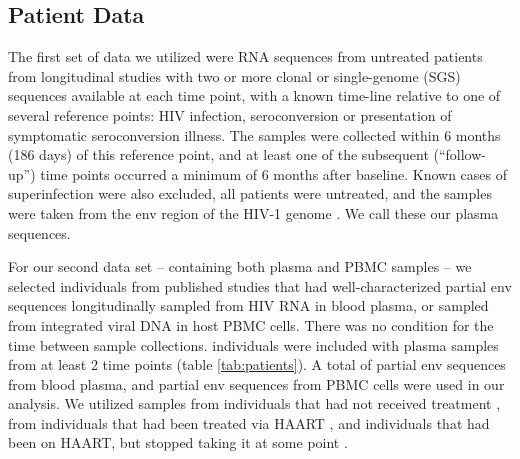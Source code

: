\subsection{Patient Data} \label{subsec:patdata}
The first set of data we utilized were RNA sequences from untreated patients from longitudinal studies with two or more clonal or single-genome (SGS) sequences available at each time point, with a known time-line relative to one of several reference points: HIV infection, seroconversion or presentation of symptomatic seroconversion illness. The samples were collected within 6 months (186 days) of this reference point, and at least one of the subsequent (“follow-up”) time points occurred a minimum of 6 months after baseline. Known cases of superinfection were also excluded, all patients were untreated, and the samples were taken from the env region of the HIV-1 genome \citep{McCloskey14}. We call these our plasma sequences. 
 
For our second data set -- containing both plasma and PBMC samples -- we selected  individuals from published studies that had well-characterized partial env sequences longitudinally sampled from HIV RNA in blood plasma, or sampled from integrated viral DNA in host PBMC cells. There was no condition for the time between sample collections.  individuals were included with 
plasma samples from at least 2 time points (table \ref{tab:patients}). A total of  partial env sequences from blood plasma, and  partial env sequences from PBMC cells were used in our analysis. We utilized samples from individuals that had not received treatment \citep{Shankarappa99, Novitsky09}, from individuals that had been treated via HAART \citep{Llewellyn06}, and individuals that had been on HAART, but stopped taking it at some point \citep{Fischer04}. 
 
